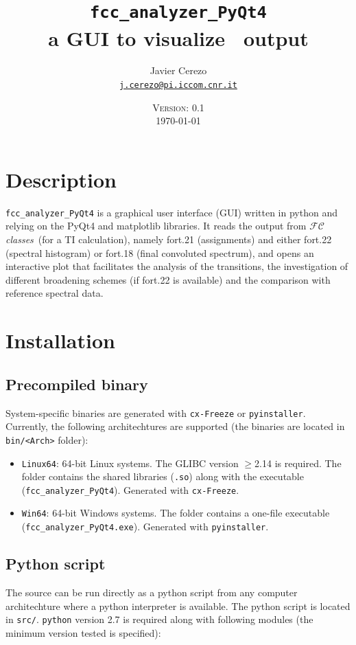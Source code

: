 \documentclass[a4paper,11pt]{article}
\title{\texttt{fcc\_analyzer\_PyQt4}\\ a GUI to visualize \fcc\ output}
\date{\textsc{Version: 0.1}\\\today}
\author{Javier Cerezo\\\href{mailto:j.cerezo@pi.iccom.cnr.it}{\texttt{j.cerezo@pi.iccom.cnr.it}}}
\begin{document}
\setlength{\parskip}{0.5em}
\newcommand{\fcc}{$\mathcal{FC}$\textit{classes}}

\maketitle

\section{Description}
\texttt{fcc\_analyzer\_PyQt4} is a graphical user interface (GUI) written in python and relying on the PyQt4 and matplotlib libraries. It reads the output from \fcc\ (for a TI calculation), namely fort.21 (assignments) and either fort.22 (spectral histogram) or fort.18 (final convoluted spectrum), and opens an interactive plot that facilitates the analysis of the transitions, the investigation of different broadening schemes (if fort.22 is available) and the comparison with reference spectral data.

\section{Installation}

\subsection{Precompiled binary}
System-specific binaries are generated with \texttt{cx-Freeze} or \texttt{pyinstaller}. Currently, the following architechtures are supported (the binaries are located in \texttt{bin/<Arch>} folder):

\begin{itemize}
 \item \texttt{Linux64}: 64-bit Linux systems. The GLIBC version $\geq$2.14 is required. The folder contains the shared libraries (\texttt{.so}) along with the executable (\texttt{fcc\_analyzer\_PyQt4}). Generated with \texttt{cx-Freeze}.
 \item \texttt{Win64}: 64-bit Windows systems. The folder contains a one-file executable (\texttt{fcc\_analyzer\_PyQt4.exe}). Generated with \texttt{pyinstaller}. 
\end{itemize}

\subsection{Python script}
The source can be run directly as a python script from any computer architechture where a python interpreter is available. The python script is located in \texttt{src/}. \texttt{python} version 2.7 is required along with following modules (the minimum version tested is specified):
\end{document}
